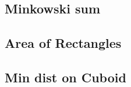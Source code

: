 \documentclass[a4paper,10pt,twocolumn,oneside]{article}
\begin{document}
% 

%

%

\subsection{Minkowski sum}


%

% 

%

%

\subsection{Area of Rectangles}


\subsection{Min dist on Cuboid}

\end{document}
